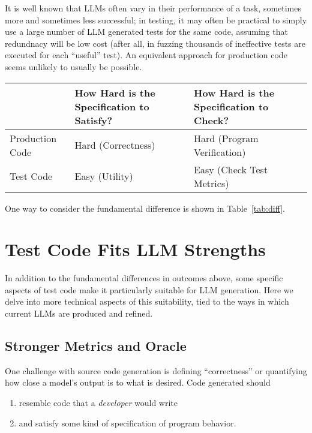 \documentclass[sigconf,natbib=false]{acmart}
\begin{document}
It is well known that LLMs often vary in their performance of a task,
sometimes more and sometimes less successful; in testing, it may often
be practical to simply use a large number of LLM generated tests for
the same code, assuming that redundnacy will be low cost (after all,
in fuzzing thousands of ineffective tests are executed for each
``useful'' test).  An equivalent approach for production code seems
unlikely to usually be possible.

\begin{table*}
  \begin{tabular}{l|l|l}
    & {\bf How Hard is the Specification to Satisfy?} & {\bf
                                                        How Hard is
                                                        the
                                                        Specification
                                                        to Check?} \\
    \hline
    Production Code & Hard  (Correctness) & Hard (Program
                                            Verification) \\
    \hline
    Test Code & Easy (Utility) & Easy (Check Test Metrics) \\
  \end{tabular}
  \end{table*}

One way to consider the fundamental difference is shown in Table~\ref{tab:diff}.

\section{Test Code Fits LLM Strengths}

In addition to the fundamental differences in outcomes above, some
specific aspects of test code make it particularly suitable for LLM
generation.  Here we delve into more technical aspects of this
suitability, tied to the ways in which current LLMs are produced and refined.

\subsection{Stronger Metrics and Oracle}

One challenge with source code generation is defining ``correctness'' or quantifying 
how close a model's output is to what is desired.  Code generated
should

\begin{enumerate}
\item resemble code that a \emph{developer} would 
  write
\item and satisfy some kind of specification of program behavior.
\end{enumerate}
\end{document}
